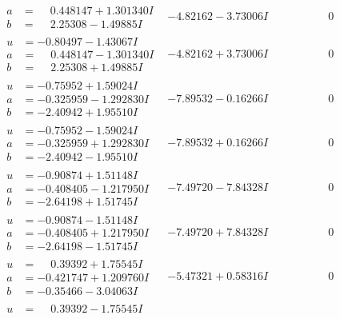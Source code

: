 \documentclass[1p]{elsarticle_modified}
\theoremstyle{definition}
\begin{document}
$$\begin{array}{c|c|c}
\begin{aligned}
a &= \phantom{-}0.448147 + 1.301340 I \\
b &= \phantom{-}2.25308 - 1.49885 I\end{aligned}
 & -4.82162 - 3.73006 I & \phantom{-0.000000 } 0 \\ \hline\begin{aligned}
u &= -0.80497 - 1.43067 I \\
a &= \phantom{-}0.448147 - 1.301340 I \\
b &= \phantom{-}2.25308 + 1.49885 I\end{aligned}
 & -4.82162 + 3.73006 I & \phantom{-0.000000 } 0 \\ \hline\begin{aligned}
u &= -0.75952 + 1.59024 I \\
a &= -0.325959 - 1.292830 I \\
b &= -2.40942 + 1.95510 I\end{aligned}
 & -7.89532 - 0.16266 I & \phantom{-0.000000 } 0 \\ \hline\begin{aligned}
u &= -0.75952 - 1.59024 I \\
a &= -0.325959 + 1.292830 I \\
b &= -2.40942 - 1.95510 I\end{aligned}
 & -7.89532 + 0.16266 I & \phantom{-0.000000 } 0 \\ \hline\begin{aligned}
u &= -0.90874 + 1.51148 I \\
a &= -0.408405 - 1.217950 I \\
b &= -2.64198 + 1.51745 I\end{aligned}
 & -7.49720 - 7.84328 I & \phantom{-0.000000 } 0 \\ \hline\begin{aligned}
u &= -0.90874 - 1.51148 I \\
a &= -0.408405 + 1.217950 I \\
b &= -2.64198 - 1.51745 I\end{aligned}
 & -7.49720 + 7.84328 I & \phantom{-0.000000 } 0 \\ \hline\begin{aligned}
u &= \phantom{-}0.39392 + 1.75545 I \\
a &= -0.421747 + 1.209760 I \\
b &= -0.35466 - 3.04063 I\end{aligned}
 & -5.47321 + 0.58316 I & \phantom{-0.000000 } 0 \\ \hline\begin{aligned}
u &= \phantom{-}0.39392 - 1.75545 I \\

\end{aligned}
\end{array}$$
\end{document}
